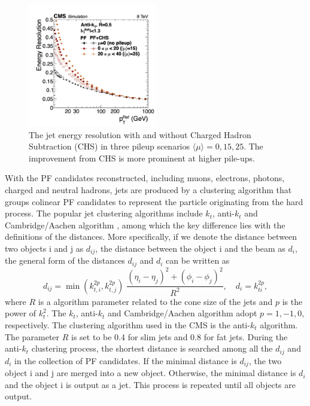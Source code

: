 \begin{figure}[ht]
    \centering
    \includegraphics[width=0.5\textwidth]{chapters/CMSExperiment/sectionReconstruction/figures/jetres_pf_chs}
    \caption{ The jet energy resolution \cite{cms:particleflow:Sirunyan:2017ulk} with and without Charged Hadron Subtraction (CHS) in three pileup scenarios $\langle \mu\rangle =0,15,25$. The improvement from CHS is more prominent at higher pile-ups.  }
    \label{fig:cmsexperiment:reconstruction:resJet}
\end{figure}



With the PF candidates reconstructed, including muons, electrons, photons, charged and neutral hadrons, jets are produced by a clustering algorithm that groups colinear PF candidates to represent the particle originating from the hard process. The popular jet clustering algorithms include $k_t$, anti-$k_t$ and Cambridge/Aachen algorithm \cite{tech:antikt:Cacciari:2008gp}, among which the key difference lies with the definitions of the distances. More specifically, if we denote the distance between two objects i and j as $d_{ij}$, the distance between the object i and the beam as $d_i$,  the general form of the distances $d_{ij}$ and $d_i$ can be written as
\begin{equation}
	d_{ij} = \min(k_{t,i}^{2p}, k_{t,j}^{2p}) \; \frac{(\eta_i-\eta_j) ^2 + (\phi_i-\phi_j) ^2}{R^2} , \quad d_i =k_{ti}^{2p},
\end{equation}
\noindent where $R$ is a algorithm parameter related to the cone size of the jets and $p$ is the power of $k_t^2$. The $k_t$, anti-$k_t$ and Cambridge/Aachen algorithm adopt $p=1,-1,0$, respectively. The clustering algorithm used in the CMS is the anti-$k_t$ algorithm. The parameter $R$ is set to be 0.4 for slim jets and 0.8 for fat jets. During the anti-$k_t$ clustering process, the shortest distance is searched among all the $d_{ij}$ and $d_i$ in the collection of PF candidates. If the minimal distance is $d_{ij}$, the two object i and j are merged into a new object. Otherwise, the minimal distance is $d_{i}$ and the object i is output as a jet. This process is repeated until all objects are output. 


